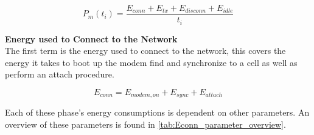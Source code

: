\begin{equation}
P_m(t_i) = \frac{E_{conn} + E_{tx} + E_{disconn} + E_{idle}}{t_i}
\end{equation}
\begin{where}
\end{where}


\textbf{Energy used to Connect to the Network}\\
The first term is the energy used to connect to the network, this covers the energy it takes to boot up the modem find and synchronize to a cell as well as perform an attach procedure. 

\begin{equation}
E_{conn} = E_{modem,on} + E_{sync} + E_{attach}
\end{equation}
\begin{where}
\end{where}

Each of these phase's energy consumptions is dependent on other parameters. An overview of these parameters is found in \autoref{tab:Econn_parameter_overview}.

